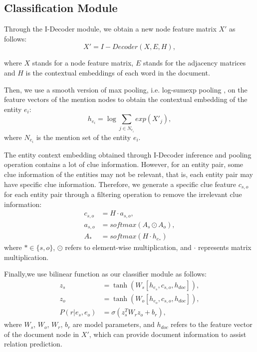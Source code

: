\documentclass[sigconf,natbib=true]{acmart}
\begin{document}
\subsection{Classification Module}
\label{sec2.3}
Through the I-Decoder module, we obtain a new node feature matrix $X'$ as follows:
\begin{equation}
    X'= I{-}Decoder (X, E, H) ,
\end{equation}

\noindent where $X$ stands for a node feature matrix, $E$ stands for the adjacency matrices and $H$ is the contextual embeddings of each word in the document. 

Then, we use a smooth version of max pooling, i.e. log-sumexp pooling \cite{c:119}, on the feature vectors of the mention nodes to obtain the contextual embedding of the entity $e_i$:
\begin{equation}
h_{e_i}=\log\sum_{j{\in}N_{e_i}}exp(X'_j) ,
\end{equation}
where $N_{e_i}$ is the mention set of the entity $e_i$.

The entity context embedding obtained through I-Decoder inference and pooling operation contains a lot of clue information.
However, for an entity pair, some clue information of the entities may not be relevant, that is, each entity pair may have specific clue information.
Therefore, we generate a specific clue feature $c_{s,o}$ for each entity pair through a filtering operation to remove the irrelevant clue information:
\begin{equation}
	\begin{split}
	    c_{s,o}&=H \cdot a_{s,o}   ,   \\
        a_{s,o}&=softmax(A_s \odot A_o) ,     \\
        A_{*}&=softmax(H \cdot h_{e_*})
	\end{split}
\label{F:4}
\end{equation}
where $*\in \{s,o\}$, $\odot$ refers to element-wise multiplication, and $\cdot$ represents matrix multiplication.

Finally,we use bilinear function as our classifier module as follows:
\begin{equation}
	\begin{split}
	    z_s&=\tanh(W_s[h_{e_s}, c_{s,o}, h_{doc}]) ,\\
	    z_o&=\tanh(W_o[h_{e_o}, c_{s,o}, h_{doc}])  ,\\
	    P(r|e_s,e_o)&=\sigma(z_s^T W_r z_o +b_r) ,
	\end{split}
\end{equation}
where $W_s$, $W_o$, $W_r$, $b_r$ are model parameters, and $h_{doc}$ refers to the feature vector of the document node in $X'$, which can provide document information to assist relation prediction.
\end{document}

